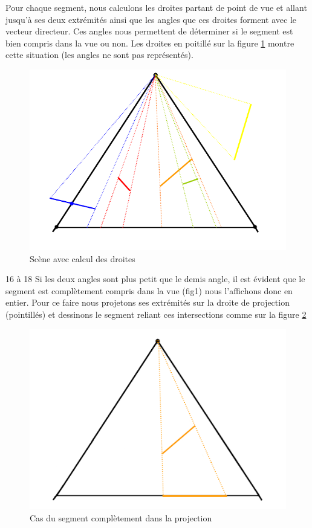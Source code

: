 \documentclass[11pt,a4paper]{article}
\begin{document}
Pour chaque segment, nous calculons les droites partant de point de vue et allant jusqu'à ses deux extrémités ainsi que les angles que ces droites forment avec le vecteur directeur. Ces angles nous permettent de déterminer si le segment est bien compris dans la vue ou non. Les droites en poitillé sur la figure \ref{exp_3} montre cette situation (les angles ne sont pas représentés).

\begin{figure}[H]
\centering
\includegraphics[scale=0.6]{inter.png}
\caption{Scène avec calcul des droites}
\label{exp_3}
\end{figure}

16 à 18 
Si les deux angles sont plus petit que le demis angle, il est évident que le segment est complètement compris dans la vue (fig1) nous l'affichons donc en entier. Pour ce faire nous projetons ses extrémités sur la droite de projection (pointillés) et dessinons le segment reliant ces intersections comme sur la figure \ref{cas1}

\begin{figure}[H]
\centering
\includegraphics[scale=0.6]{cas1.png}
\caption{Cas du segment complètement dans la projection}
\label{cas1}
\end{figure}
\end{document}
